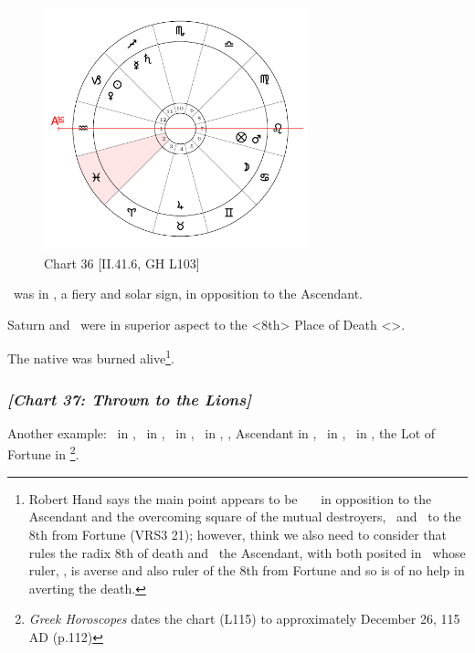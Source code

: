 \clearpage
\begin{figure}
\centering
\vspace{-20pt}
\includegraphics[width=0.68\textwidth]{charts/2_41_6}
\caption{Chart 36 [II.41.6, GH L103]}
\label{fig:chart36}
\end{figure}

\noindent \Mars\, was in \Leo, a fiery and solar sign, in opposition to the Ascendant. 

Saturn and \Mercury\, were in superior aspect to the <8th> Place of Death <\Pisces>. 

The native was burned alive\footnote{Robert Hand says the main point appears to be \Mars\, \Conjunction\, \Fortune\, in opposition to the Ascendant and the overcoming square of the mutual destroyers, \Mercury\, and \Saturn\, to the 8th from Fortune (VRS3 21); however, think we  also need to consider that \Mercury\, rules the radix 8th of death  and \Saturn\, the Ascendant, with both posited in \Sagittarius\, whose ruler, \Jupiter, is averse and also ruler of the 8th from Fortune  and so is of no help in averting the death.}.
\newpage
\subsubsection{\textit{[Chart 37: Thrown to the Lions]}}
Another example: \Sun\, in \Capricorn, \Moon\, in \Libra, \Saturn\, in \Taurus, \Jupiter\, in \Gemini, \Mars, Ascendant in \Cancer, \Venus\, in \Aquarius, \Mercury\, in \Sagittarius, the Lot of Fortune in \Libra
\footnote{\textit{Greek Horoscopes} dates the chart (L115) to approximately December 26, 115 AD (p.112)}. 

